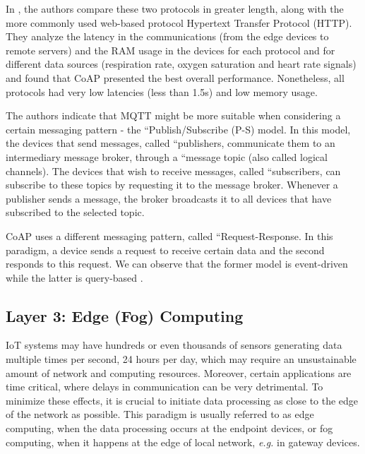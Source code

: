 In \cite{Rubi2019}, the authors compare these two protocols in greater length, along with the more commonly used web-based protocol Hypertext Transfer Protocol (HTTP). They analyze the latency in the communications (from the edge devices to remote servers) and the RAM usage in the devices for each protocol and for different data sources (respiration rate, oxygen saturation and heart rate signals) and found that \acs{CoAP} presented the best overall performance. Nonetheless, all protocols had very low latencies (less than 1.5s) and low memory usage. \bigskip

The authors indicate that \acs{MQTT} might be more suitable when considering a certain messaging pattern - the ``Publish/Subscribe (P-S) model. In this model, the devices that send messages, called ``publishers, communicate them to an intermediary message broker, through a ``message topic (also called logical channels). The devices that wish to receive messages, called ``subscribers, can subscribe to these topics by requesting it to the message broker. Whenever a publisher sends a message, the broker broadcasts it to all devices that have subscribed to the selected topic. \bigskip

\acs{CoAP} uses a different messaging pattern, called ``Request-Response. In this paradigm, a device sends a request to receive certain data and the second responds to this request. We can observe that the former model is event-driven while the latter is query-based \cite{Rubi2019}. %

\subsection{Layer 3: Edge (Fog) Computing}
\label{sec:iot-model-layer3}

\acs{IoT} systems may have hundreds or even thousands of sensors generating data multiple times per second, 24 hours per day, which may require an unsustainable amount of network and computing resources. Moreover, certain applications are time critical, where delays in communication can be very detrimental. To minimize these effects, it is crucial to initiate data processing as close to the edge of the network as possible. This paradigm is usually referred to as edge computing, when the data processing occurs at the endpoint devices, or fog computing, when it happens at the edge of local network, \textit{e.g.} in gateway devices. \bigskip

